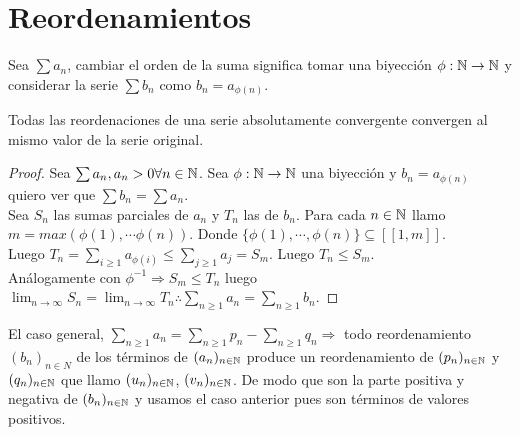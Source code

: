 \section{Reordenamientos}

\begin{definition}
  Sea $\sum a_n$, cambiar el orden de la suma significa tomar una biyección $\phi: \mathbb{N} \to \mathbb{N}$ y considerar la serie $\sum b_n$ como $b_n = a_{\phi(n)}$.
\end{definition}

\begin{theorem}
  Todas las reordenaciones de una serie absolutamente convergente convergen al mismo valor de la serie original.
  \begin{proof}
    Sea $\sum a_n, a_n > 0 \forall n \in \mathbb{N}$. Sea $\phi: \mathbb{N} \to \mathbb{N}$ una biyección y $b_n = a_{\phi(n)}$ quiero ver que $\sum b_n = \sum a_n$. \\
    Sea $S_n$ las sumas parciales de $a_n$ y $T_n$ las de $b_n$. Para cada $n \in \mathbb{N}$ llamo $m = max(\phi(1), \cdots \phi(n))$. Donde $\{ \phi(1), \cdots, \phi(n) \} \subseteq [[1, m]]$. \\
    Luego $T_n = \sum_{i \geq 1} a_{\phi(i)} \leq \sum_{j \geq 1} a_j = S_m$. Luego $T_n \leq S_m$. \\
    Análogamente con $\phi^{-1} \Rightarrow S_m \leq T_n$ luego $\lim_{n \to \infty} S_n = \lim_{n \to \infty} T_n \therefore \sum_{n \geq 1} a_n = \sum_{n \geq 1} b_n$.
  \end{proof}
\end{theorem}

El caso general, $\sum_{n \geq 1} a_n = \sum_{n \geq 1} p_n - \sum_{n \geq 1} q_n \Rightarrow$ todo reordenamiento $(b_n)_{n \in N}$ de los términos de $(a_n)_{n \in \mathbb{N}}$ produce un reordenamiento de $(p_n)_{n \in \mathbb{N}}$ y $(q_n)_{n \in \mathbb{N}}$ que llamo $(u_n)_{n \in \mathbb{N}}$, $(v_n)_{n \in \mathbb{N}}$. De modo que son la parte positiva y negativa de $(b_n)_{n \in \mathbb{N}}$ y usamos el caso anterior pues son términos de valores positivos.

\clearpage

